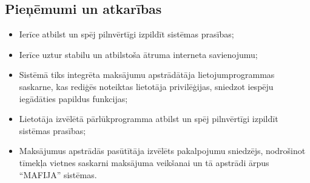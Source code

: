 \subsection{Pieņēmumi un atkarības}
\begin{itemize}
	\item Ierīce atbilst un spēj pilnvērtīgi izpildīt sistēmas prasības;

	\item Ierīce uztur stabilu un atbilstoša ātruma interneta savienojumu;

	\item Sistēmā tiks integrēta maksājumu apstrādātāja lietojumprogrammas
	      saskarne, kas rediģēs noteiktas lietotāja privilēģijas, sniedzot
	      iespēju iegādāties papildus funkcijas;

	\item Lietotāja izvēlētā pārlūkprogramma atbilst un spēj pilnvērtīgi
	      izpildīt sistēmas prasības;

	\item Maksājumus apstrādās pasūtītāja izvēlēts pakalpojumu sniedzējs,
	      nodrošinot tīmekļa vietnes saskarni maksājuma veikšanai un tā apstrādi
	      ārpus ``MAFIJA'' sistēmas.
\end{itemize}
